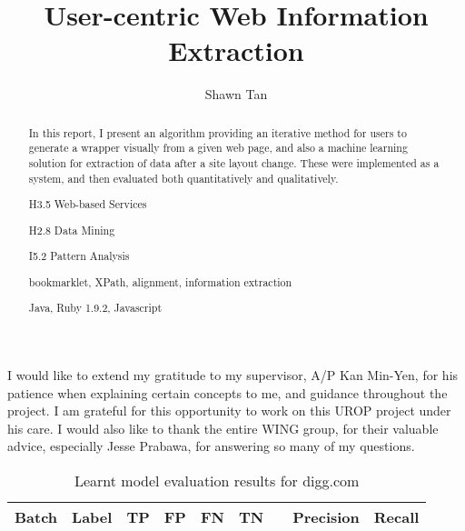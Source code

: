 \documentclass[urop]{socreport}
\begin{document}
\title{User-centric Web Information Extraction}
\author{Shawn Tan}
\maketitle
\begin{abstract}
In this report, I present an algorithm providing an iterative method for users to generate a 
wrapper visually from a given web page, and also a machine learning solution for extraction of
data after a site layout change. These were implemented as a system, and then evaluated 
both quantitatively and qualitatively. 

\begin{descriptors}
	\item H3.5 Web-based Services
    \item H2.8 Data Mining
	\item I5.2 Pattern Analysis
\end{descriptors}
\begin{keywords}
	bookmarklet,  XPath, alignment, information extraction
\end{keywords}
\begin{implement}
	Java, Ruby 1.9.2, Javascript
\end{implement}
\end{abstract}

\begin{acknowledgement}
	I would like to extend my gratitude to my supervisor, A/P Kan Min-Yen, for his patience
when explaining certain concepts to me, and guidance throughout the project. I am grateful
for this opportunity to work on this UROP project under his care. I would also like to thank
the entire WING group, for their valuable advice, especially Jesse Prabawa, for answering 
so many of my questions. 
\end{acknowledgement}

\listoffigures 
\listoftables
\tableofcontents 











\newpage
\appendix

\begin{table}
\centering
\small
\begin{tabular}{|c|c|c|c|c|c|c|c|c|}
\hline
Batch	&Label	&TP	&FP	&FN	&TN	&	&Precision	&Recall\\
\hline

\hline 
\end{tabular}
\caption{Learnt model evaluation results for digg.com}
\end{table}
\end{document}
